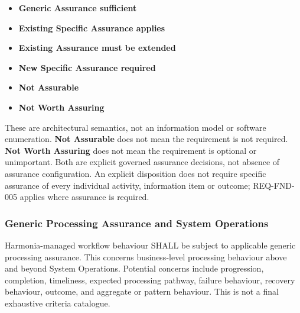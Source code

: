 \begin{itemize}

\item 
\textbf{Generic Assurance sufficient}



\item 
\textbf{Existing Specific Assurance applies}



\item 
\textbf{Existing Assurance must be extended}



\item 
\textbf{New Specific Assurance required}



\item 
\textbf{Not Assurable}



\item 
\textbf{Not Worth Assuring}



\end{itemize}
\label{rad:enabling:714}

These are architectural semantics, not an information model or software enumeration. \textbf{Not Assurable} does not mean the requirement is not required. \textbf{Not Worth Assuring} does not mean the requirement is optional or unimportant. Both are explicit governed assurance decisions, not absence of assurance configuration. An explicit disposition does not require specific assurance of every individual activity, information item or outcome; REQ-FND-005 applies where assurance is required.

\label{rad:enabling:716}
\subsubsection*{Generic Processing Assurance and System Operations}
\label{rad:enabling:718}

Harmonia-managed workflow behaviour SHALL be subject to applicable generic processing assurance. This concerns business-level processing behaviour above and beyond System Operations. Potential concerns include progression, completion, timeliness, expected processing pathway, failure behaviour, recovery behaviour, outcome, and aggregate or pattern behaviour. This is not a final exhaustive criteria catalogue.

\label{rad:enabling:720}


